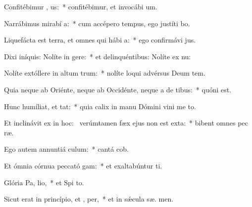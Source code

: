 \item Confitébimur , us:~* confitébimur, et invocábi  um.
\item Narrábimus mirabí a:~* cum accépero tempus, ego justíti bo.
\item Liquefácta est terra, et omnes qui hábi  a:~* ego confirmávi  jus.
\item Dixi iníquis: Nolíte in gere:~* et delinquéntibus: Nolíte ex nu:
\item Nolíte extóllere in altum  trum:~* nolíte loqui advérsus Deum tem.
\item Quia neque ab Oriénte, neque ab Occidénte, neque a de tibus:~* quóni   est.
\item Hunc humíliat, et  tat:~* quia calix in manu Dómini vini me  to.
\item Et inclinávit ex  in hoc:~\pscross{} verúmtamen fæx ejus non est exta:~* bibent omnes pec ræ.
\item Ego autem annuntiá  culum:~* cantá  cob.
\item Et ómnia córnua peccató gam:~* et exaltabúntur  ti.
\item Glória Pa,  lio,~* et Spi to.
\item Sicut erat in princípio, et ,  per,~* et in sǽcula sæ. men.
